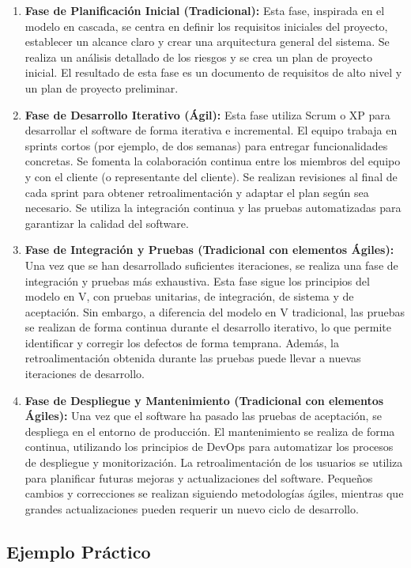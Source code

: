 \documentclass[12pt, spanish]{article}
\begin{document}
\begin{enumerate}
  \item \textbf{Fase de Planificación Inicial (Tradicional):} Esta fase, inspirada en el modelo en cascada, se centra en definir los requisitos iniciales del proyecto, establecer un alcance claro y crear una arquitectura general del sistema. Se realiza un análisis detallado de los riesgos y se crea un plan de proyecto inicial. El resultado de esta fase es un documento de requisitos de alto nivel y un plan de proyecto preliminar.
  \item \textbf{Fase de Desarrollo Iterativo (Ágil):}  Esta fase utiliza Scrum o XP para desarrollar el software de forma iterativa e incremental.  El equipo trabaja en sprints cortos (por ejemplo, de dos semanas) para entregar funcionalidades concretas. Se fomenta la colaboración continua entre los miembros del equipo y con el cliente (o representante del cliente). Se realizan revisiones al final de cada sprint para obtener retroalimentación y adaptar el plan según sea necesario. Se utiliza la integración continua y las pruebas automatizadas para garantizar la calidad del software.
  \item \textbf{Fase de Integración y Pruebas (Tradicional con elementos Ágiles):} Una vez que se han desarrollado suficientes iteraciones, se realiza una fase de integración y pruebas más exhaustiva.  Esta fase sigue los principios del modelo en V, con pruebas unitarias, de integración, de sistema y de aceptación. Sin embargo, a diferencia del modelo en V tradicional, las pruebas se realizan de forma continua durante el desarrollo iterativo, lo que permite identificar y corregir los defectos de forma temprana.  Además, la retroalimentación obtenida durante las pruebas puede llevar a nuevas iteraciones de desarrollo.
  \item \textbf{Fase de Despliegue y Mantenimiento (Tradicional con elementos Ágiles):}  Una vez que el software ha pasado las pruebas de aceptación, se despliega en el entorno de producción. El mantenimiento se realiza de forma continua, utilizando los principios de DevOps para automatizar los procesos de despliegue y monitorización.  La retroalimentación de los usuarios se utiliza para planificar futuras mejoras y actualizaciones del software.  Pequeños cambios y correcciones se realizan siguiendo metodologías ágiles, mientras que grandes actualizaciones pueden requerir un nuevo ciclo de desarrollo.
\end{enumerate}

\subsection{Ejemplo Práctico}
\end{document}
